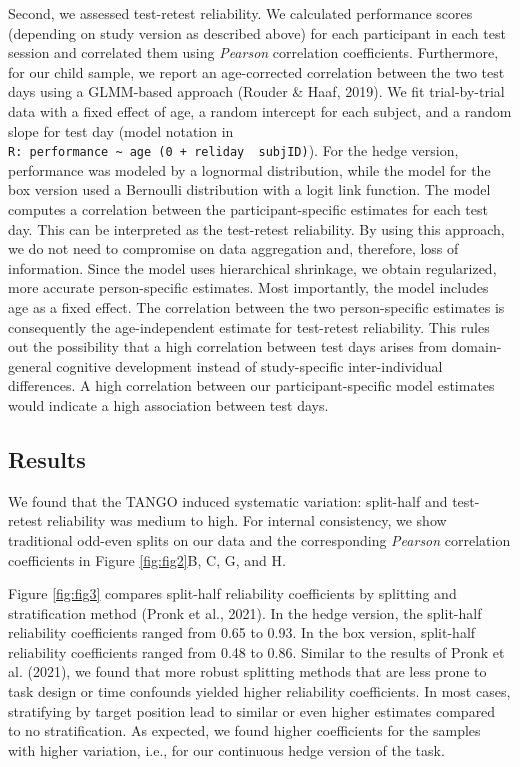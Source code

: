 \documentclass[
  man,floatsintext]{apa6}
\begin{document}
Second, we assessed test-retest reliability.
We calculated performance scores (depending on study version as described above) for each participant in each test session and correlated them using \emph{Pearson} correlation coefficients.
Furthermore, for our child sample, we report an age-corrected correlation between the two test days using a GLMM-based approach (Rouder \& Haaf, 2019).
We fit trial-by-trial data with a fixed effect of age, a random intercept for each subject, and a random slope for test day (model notation in \texttt{R:\ performance\ \textasciitilde{}\ age\ (0\ +\ reliday\ \textbar{}\ subjID)}).
For the hedge version, performance was modeled by a lognormal distribution, while the model for the box version used a Bernoulli distribution with a logit link function.
The model computes a correlation between the participant-specific estimates for each test day.
This can be interpreted as the test-retest reliability.
By using this approach, we do not need to compromise on data aggregation and, therefore, loss of information.
Since the model uses hierarchical shrinkage, we obtain regularized, more accurate person-specific estimates.
Most importantly, the model includes age as a fixed effect.
The correlation between the two person-specific estimates is consequently the age-independent estimate for test-retest reliability.
This rules out the possibility that a high correlation between test days arises from domain-general cognitive development instead of study-specific inter-individual differences.
A high correlation between our participant-specific model estimates would indicate a high association between test days.

\hypertarget{results-1}{%
\subsection{Results}\label{results-1}}

We found that the TANGO induced systematic variation: split-half and test-retest reliability was medium to high.
For internal consistency, we show traditional odd-even splits on our data and the corresponding \emph{Pearson} correlation coefficients in Figure \ref{fig:fig2}B, C, G, and H.

Figure \ref{fig:fig3} compares split-half reliability coefficients by splitting and stratification method (Pronk et al., 2021).
In the hedge version, the split-half reliability coefficients ranged from 0.65 to 0.93.
In the box version, split-half reliability coefficients ranged from 0.48 to 0.86.
Similar to the results of Pronk et al. (2021), we found that more robust splitting methods that are less prone to task design or time confounds yielded higher reliability coefficients.
In most cases, stratifying by target position lead to similar or even higher estimates compared to no stratification.
As expected, we found higher coefficients for the samples with higher variation, i.e., for our continuous hedge version of the task.
\end{document}
